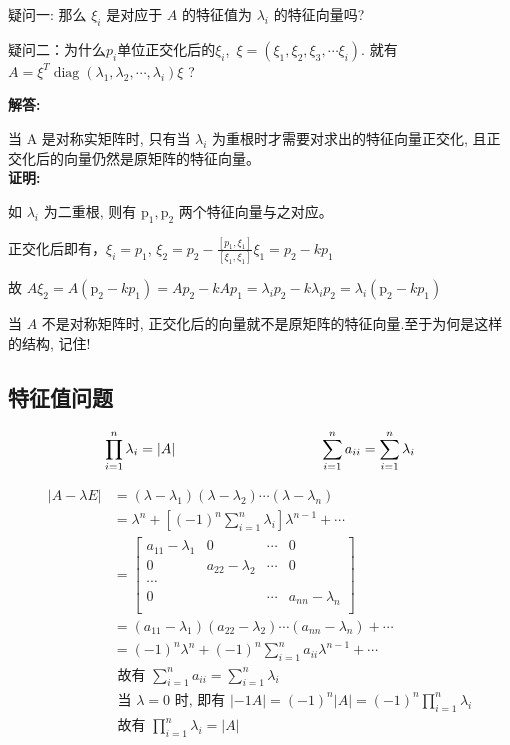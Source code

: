 \documentclass[fontset=windows]{article}
\begin{document}
    疑问一: 那么 $\xi_i$ 是对应于 $A$ 的特征值为 $\lambda_i$ 的特征向量吗? 

    疑问二：为什么$p_i$单位正交化后的$\xi_i$,~$\xi=\left(\xi_1, \xi_2, \xi_3, \cdots \xi_i\right)$. 
    就有 $A=\xi^T \operatorname{diag}\left(\lambda_1, \lambda_2, \cdots, \lambda_i\right) \xi$ ?

    \noindent\textbf{解答:}

    当 $\mathrm{A}$ 是对称实矩阵时, 只有当 $\lambda_i$ 为重根时才需要对求出的特征向量正交化, 且正交化后的向量仍然是原矩阵的特征向量。\\
    \textbf{证明:}

    如 $\lambda_i$ 为二重根, 则有 $\mathrm{p}_1, \mathrm{p}_2$ 两个特征向量与之对应。

    正交化后即有，$\xi_i=p_1$, $\xi_2=p_2-\frac{[p_1,\xi_1]}{[\xi_1,\xi_1]}\xi_1=p_2-kp_1$

    故 $A \xi_2=A\left(\mathrm{p}_2-k p_1\right)=A p_2-k A p_1=\lambda_i p_2-k \lambda_i p_2=\lambda_i\left(\mathrm{p}_2-k p_1\right)$

    当 $A$ 不是对称矩阵时, 正交化后的向量就不是原矩阵的特征向量.至于为何是这样的结构, 记住!
    \subsection{特征值问题}
    \begin{tcolorbox}[colback=blue!5!white,colframe=blue!75!black,title=特征值的性质]
    \[
        \prod_{i=1}^n \lambda_i=|A|\hspace*{0.3\linewidth}\sum_{i=1}^n a_{i i}=\sum_{i=1}^n \lambda_i
    \]
    \end{tcolorbox}
    \begin{align}
        |A-\lambda E|&=\left(\lambda-\lambda_1\right)\left(\lambda-\lambda_2\right) \cdots\left(\lambda-\lambda_n\right)\nonumber\\
        &=\lambda^n+\left[(-1)^n \sum_{i=1}^n \lambda_i\right] \lambda^{n-1}+\cdots\nonumber\\
        &=\begin{bmatrix}
                 a_{11}-\lambda_1 & 0  & \cdots & 0\\
                 0  & a_{22}-\lambda_2 & \cdots & 0\\
                 \cdots\\
                 0  &    & \cdots & a_{nn}-\lambda_n\\
            \end{bmatrix}\nonumber\\
        &=(a_{11}-\lambda_1)(a_{22}-\lambda_2)\cdots(a_{nn}-\lambda_n)+\cdots\nonumber\\
        &=(-1)^n \lambda^n+(-1)^n \sum_{i=1}^n a_{i i} \lambda^{n-1}+\cdots\nonumber\\
        &\text { 故有 } \sum_{i=1}^n a_{i i}=\sum_{i=1}^n \lambda_i\nonumber\\
        &\text { 当 } \lambda=0 \text { 时, 即有 }|-1 A|=(-1)^n|A|=(-1)^n \prod_{i=1}^n \lambda_i\nonumber\\
        &\text { 故有 } \prod_{i=1}^n \lambda_i=|A|\nonumber
    \end{align}
\end{document}
